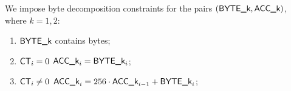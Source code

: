 We impose byte decomposition constraints for the pairs $(\textsf{BYTE}\textsf{\_k}, \textsf{ACC}\textsf{\_k})$, where $k = 1, 2$:
\begin{enumerate}
	\item $\textsf{BYTE}\textsf{\_k}$ contains bytes;
	\item \If $\textsf{CT}_{i} = 0$ \Then $\textsf{ACC}\textsf{\_k}_{i} = \textsf{BYTE}\textsf{\_k}_{i}$;
	\item \If $\textsf{CT}_{i} \neq 0$ \Then $\textsf{ACC}\textsf{\_k}_{i} = 256 \cdot \textsf{ACC}\textsf{\_k}_{i - 1} + \textsf{BYTE}\textsf{\_k}_{i}$;
\end{enumerate}
